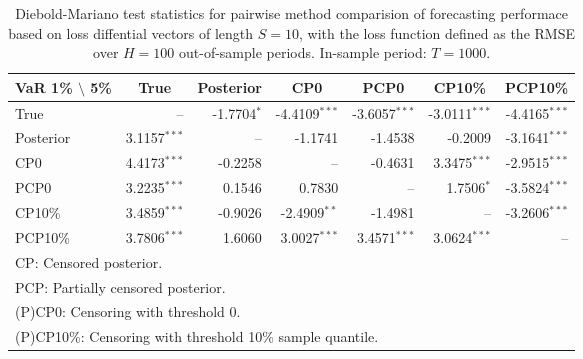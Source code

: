 { \renewcommand{\arraystretch}{1.2} 
\begin{table} 
\center 
\begin{tabular}{l | rrr rrr} 
VaR 1\% $\setminus$ 5\% & \multicolumn{1}{c}{True} & \multicolumn{1}{c}{Posterior} & \multicolumn{1}{c}{CP0} & \multicolumn{1}{c}{PCP0} & \multicolumn{1}{c}{CP10\%} & \multicolumn{1}{c}{PCP10\%} \\ \hline 
True &    --\phantom{$^{***}$} & -1.7704$^{*}$\phantom{$^{**}$} & -4.4109$^{***}$ & -3.6057$^{***}$ & -3.0111$^{***}$ & -4.4165$^{***}$  \\ 
Posterior & 3.1157$^{***}$ &    --\phantom{$^{***}$} & -1.1741\phantom{$^{***}$} & -1.4538\phantom{$^{***}$} & -0.2009\phantom{$^{***}$} & -3.1641$^{***}$  \\ 
CP0 & 4.4173$^{***}$ & -0.2258\phantom{$^{***}$} &    --\phantom{$^{***}$} & -0.4631\phantom{$^{***}$} & 3.3475$^{***}$ & -2.9515$^{***}$  \\ 
PCP0 & 3.2235$^{***}$ & 0.1546\phantom{$^{***}$} & 0.7830\phantom{$^{***}$} &    --\phantom{$^{***}$} & 1.7506$^{*}$\phantom{$^{**}$} & -3.5824$^{***}$  \\ 
CP10\% & 3.4859$^{***}$ & -0.9026\phantom{$^{***}$} & -2.4909$^{**}$\phantom{$^{*}$} & -1.4981\phantom{$^{***}$} &    --\phantom{$^{***}$} & -3.2606$^{***}$  \\ 
PCP10\% & 3.7806$^{***}$ & 1.6060\phantom{$^{***}$} & 3.0027$^{***}$ & 3.4571$^{***}$ & 3.0624$^{***}$ &    --\phantom{$^{***}$}  \\ 
\hline 
\multicolumn{7}{l}{\footnotesize{CP: Censored posterior.}}  \\ 
\multicolumn{7}{l}{\footnotesize{PCP: Partially censored posterior.}} \\ 
\multicolumn{7}{l}{\footnotesize{(P)CP0: Censoring with threshold 0.}} \\ 
\multicolumn{7}{l}{\footnotesize{(P)CP10\%: Censoring with threshold 10\% sample quantile.}}  \\ 
\end{tabular}
 \caption{Diebold-Mariano test statistics for  pairwise method comparision of forecasting performace based on loss diffential vectors of length $S = 10$, with the loss function defined as the RMSE over $H=100$ out-of-sample periods. In-sample period: $T = 1000$.} 
\label{tab:agarch11_DM_T_1000}  
\end{table}
}